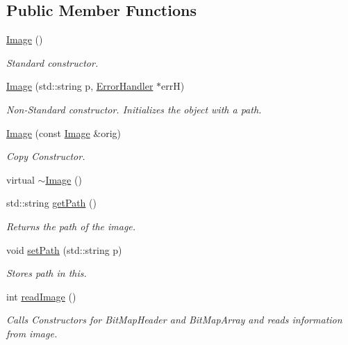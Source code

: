 \subsection*{Public Member Functions}
\begin{DoxyCompactItemize}
\item 
\mbox{\hyperlink{classImage_a58edd1c45b4faeb5f789b0d036d02313}{Image}} ()
\begin{DoxyCompactList}\small\item\em Standard constructor. \end{DoxyCompactList}\item 
\mbox{\hyperlink{classImage_ae17a70dac9941346eab9e5abef1c03c7}{Image}} (std\+::string p, \mbox{\hyperlink{classErrorHandler}{Error\+Handler}} $\ast$errH)
\begin{DoxyCompactList}\small\item\em Non-\/\+Standard constructor. Initializes the object with a path. \end{DoxyCompactList}\item 
\mbox{\hyperlink{classImage_abda271aa11b907dda8c8c8176684227d}{Image}} (const \mbox{\hyperlink{classImage}{Image}} \&orig)
\begin{DoxyCompactList}\small\item\em Copy Constructor. \end{DoxyCompactList}\item 
virtual \mbox{\hyperlink{classImage_a0294f63700543e11c0f0da85601c7ae5}{$\sim$\+Image}} ()
\item 
std\+::string \mbox{\hyperlink{classImage_a885989eb723cb0a1fc0555c7e8de817e}{get\+Path}} ()
\begin{DoxyCompactList}\small\item\em Returns the path of the image. \end{DoxyCompactList}\item 
void \mbox{\hyperlink{classImage_aabb8cec47c25c0e3a36ba2a455c2aa6c}{set\+Path}} (std\+::string p)
\begin{DoxyCompactList}\small\item\em Stores path in this. \end{DoxyCompactList}\item 
int \mbox{\hyperlink{classImage_ac0aa1f41cb368d87b20dd38839218d93}{read\+Image}} ()
\begin{DoxyCompactList}\small\item\em Calls Constructors for Bit\+Map\+Header and Bit\+Map\+Array and reads information from image. \end{DoxyCompactList}\item 

\end{DoxyCompactItemize}
